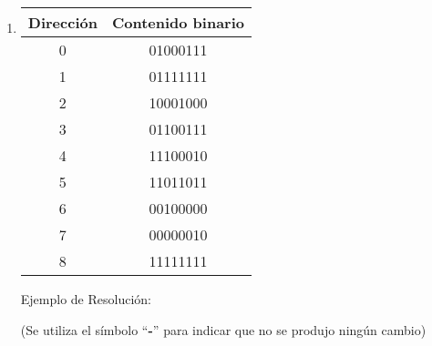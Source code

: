 \documentclass[12pt]{article}
\begin{document}
\begin{enumerate}

\item \begin{tabular}{| c | c |}
        \hline
        \textbf{Dirección}&\textbf{Contenido binario}\\
        \hline \hline
        0 & 01000111 \\
        \hline
        1 & 01111111 \\
        \hline
        2 & 10001000 \\
        \hline
        3 & 01100111 \\
        \hline
        4 & 11100010 \\
        \hline
        5 & 11011011 \\
        \hline
        6 & 00100000 \\
        \hline
        7 & 00000010 \\
        \hline
        8 & 11111111 \\
        \hline
        \hline
\end{tabular}

Ejemplo de Resolución:

{\tiny(Se utiliza el símbolo ``\textbf{-}'' para indicar que no se produjo
        ningún cambio)}


\end{enumerate}
\end{document}
